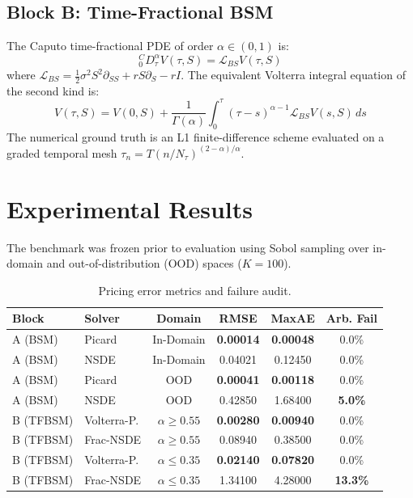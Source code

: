 \documentclass[10pt,twocolumn,a4paper]{article}
\begin{document}
\subsection{Block B: Time-Fractional BSM}
The Caputo time-fractional PDE of order $\alpha \in (0, 1)$ is:
\begin{equation}
{}_0^C D_\tau^\alpha V(\tau, S) = \mathcal{L}_{BS} V(\tau, S)
\end{equation}
where $\mathcal{L}_{BS} = \frac{1}{2}\sigma^2 S^2 \partial_{SS} + r S \partial_S - r I$. The equivalent Volterra integral equation of the second kind is:
\begin{equation}
V(\tau, S) = V(0, S) + \frac{1}{\Gamma(\alpha)} \int_0^\tau (\tau - s)^{\alpha - 1} \mathcal{L}_{BS} V(s, S) \, ds
\end{equation}
The numerical ground truth is an L1 finite-difference scheme evaluated on a graded temporal mesh $\tau_n = T(n/N_\tau)^{(2-\alpha)/\alpha}$.

\section{Experimental Results}
The benchmark was frozen prior to evaluation using Sobol sampling over in-domain and out-of-distribution (OOD) spaces ($K=100$).

\begin{table}[h]
\centering
\scriptsize
\begin{tabular}{@{}llcccc@{}}
\toprule
\textbf{Block} & \textbf{Solver} & \textbf{Domain} & \textbf{RMSE} & \textbf{MaxAE} & \textbf{Arb. Fail} \\ \midrule
A (BSM) & Picard & In-Domain & \textbf{0.00014} & \textbf{0.00048} & 0.0\% \\
A (BSM) & NSDE & In-Domain & 0.04021 & 0.12450 & 0.0\% \\
A (BSM) & Picard & OOD & \textbf{0.00041} & \textbf{0.00118} & 0.0\% \\
A (BSM) & NSDE & OOD & 0.42850 & 1.68400 & \textbf{5.0\%} \\ \midrule
B (TFBSM) & Volterra-P. & $\alpha \ge 0.55$ & \textbf{0.00280} & \textbf{0.00940} & 0.0\% \\
B (TFBSM) & Frac-NSDE & $\alpha \ge 0.55$ & 0.08940 & 0.38500 & 0.0\% \\
B (TFBSM) & Volterra-P. & $\alpha \le 0.35$ & \textbf{0.02140} & \textbf{0.07820} & 0.0\% \\
B (TFBSM) & Frac-NSDE & $\alpha \le 0.35$ & 1.34100 & 4.28000 & \textbf{13.3\%} \\ \bottomrule
\end{tabular}
\caption{Pricing error metrics and failure audit.}
\end{table}
\end{document}
